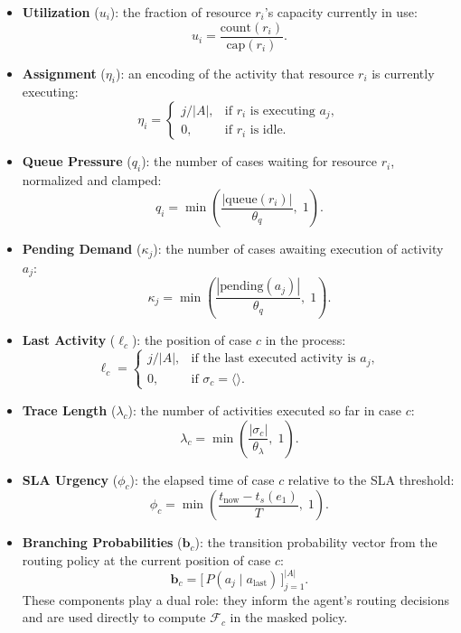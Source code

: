\documentclass[journal,onecolumn]{IEEEtran}
\begin{document}
\begin{itemize}
    \item \textbf{Utilization} ($u_i$): the fraction of resource
    $r_i$'s capacity currently in use:
    \[
        u_i = \frac{\text{count}(r_i)}{\text{cap}(r_i)}.
    \]

    \item \textbf{Assignment} ($\eta_i$): an encoding of the
    activity that resource $r_i$ is currently executing:
    \[
        \eta_i =
        \begin{cases}
            j / |A|, & \text{if } r_i \text{ is executing } a_j, \\
            0,       & \text{if } r_i \text{ is idle.}
        \end{cases}
    \]

    \item \textbf{Queue Pressure} ($q_i$): the number of cases
    waiting for resource $r_i$, normalized and clamped:
    \[
        q_i = \min\!\left(\frac{|\text{queue}(r_i)|}{\theta_q},\;
        1\right).
    \]

    \item \textbf{Pending Demand} ($\kappa_j$): the number of
    cases awaiting execution of activity $a_j$:
    \[
        \kappa_j = \min\!\left(
        \frac{|\text{pending}(a_j)|}{\theta_q},\; 1\right).
    \]

    \item \textbf{Last Activity} ($\ell_c$): the position of
    case $c$ in the process:
    \[
        \ell_c =
        \begin{cases}
            j / |A|, & \text{if the last executed activity is }
            a_j, \\
            0, & \text{if } \sigma_c = \langle\rangle.
        \end{cases}
    \]

    \item \textbf{Trace Length} ($\lambda_c$): the number of
    activities executed so far in case $c$:
    \[
        \lambda_c = \min\!\left(\frac{|\sigma_c|}{\theta_\lambda},
        \; 1\right).
    \]

    \item \textbf{SLA Urgency} ($\phi_c$): the elapsed time of
    case $c$ relative to the SLA threshold:
    \[
        \phi_c = \min\!\left(\frac{t_{\text{now}} -
        t_s(e_1)}{T},\; 1\right).
    \]

    \item \textbf{Branching Probabilities} ($\mathbf{b}_c$): the
    transition probability vector from the routing policy at the
    current position of case $c$:
    \[
        \mathbf{b}_c = \big[\, P(a_j \mid a_{\text{last}})
        \,\big]_{j=1}^{|A|}.
    \]
    These components play a dual role: they inform the agent's
    routing decisions and are used directly to compute
    $\mathcal{F}_c$ in the masked policy.


\end{itemize}
\end{document}
